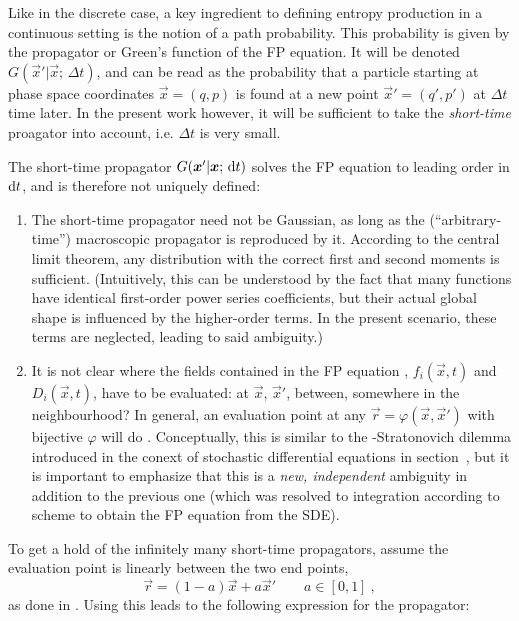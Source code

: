 Like in the discrete case, a key ingredient to defining entropy production in a continuous setting is the notion of a path probability. This probability is given by the propagator or Green's function of the FP equation. It will be denoted \(G(\vec x'|\vec x;\,\Delta t)\), and can be read as the probability that a particle starting at phase space coordinates \(\vec x = (q,p)\) is found at a new point \(\vec x' = (q',p')\) at \(\Delta t\) time later. In the present work however, it will be sufficient to take the \emph{short-time} proagator into account, i.e. \(\Delta t\) is very small.

The short-time propagator \(G(\boldsymbol{x}'|\boldsymbol{x};\,\mathrm{d} t)\) solves the FP equation to leading order in \(\mathrm{d} t\), and is therefore not uniquely defined:
%
\begin{enumerate}
	\item The short-time propagator need not be Gaussian, as long as the (``arbitrary-time'') macroscopic propagator is reproduced by it. According to the central limit theorem, any distribution with the correct first and second moments is sufficient. (Intuitively, this can be understood by the fact that many functions have identical first-order power series coefficients, but their actual global shape is influenced by the higher-order terms. In the present scenario, these terms are neglected, leading to said ambiguity.)
	\item It is not clear where the fields contained in the FP equation , \(f_i(\vec x,t)\) and \(D_i(\vec x,t)\), have to be evaluated: at \(\vec x\), \(\vec x'\), between, somewhere in the neighbourhood? In general, an evaluation point at any \(\vec r = \varphi(\vec x,\vec x')\) with bijective \(\varphi\) will do \cite{wissel}. Conceptually, this is similar to the \Ito{}-Stratonovich dilemma introduced in the conext of stochastic differential equations in section~, but it is important to emphasize that this is a \emph{new, independent} ambiguity in addition to the previous one (which was resolved to integration according to \Ito{} scheme to obtain the FP equation from the SDE).
\end{enumerate}
%
To get a hold of the infinitely many short-time propagators, assume the evaluation point is linearly between the two end points,
%
\begin{equation}
	\vec r = (1-a)\vec x + a\vec x' \qquad a\in[0,1] ~,
\end{equation}
%
as done in \cite{sf}. Using \cite{wissel, donoso} this leads to the following expression for the propagator:
